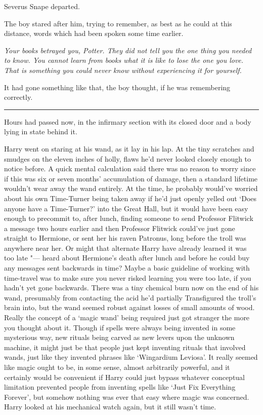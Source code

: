 Severus Snape departed.

The boy stared after him, trying to remember, as best as he could at
this distance, words which had been spoken some time earlier.

\emph{Your books betrayed you, Potter. They did not tell you the one
thing you needed to know. You cannot learn from books what it is like to
lose the one you love. That is something you could never know without
experiencing it for yourself.}

It had gone something like that, the boy thought, if he was remembering
correctly.

\begin{center}\rule{3in}{0.4pt}\end{center}

Hours had passed now, in the infirmary section with its closed door and
a body lying in state behind it.

Harry went on staring at his wand, as it lay in his lap. At the tiny
scratches and smudges on the eleven inches of holly, flaws he'd never
looked closely enough to notice before. A quick mental calculation said
there was no reason to worry since if this was six or seven months'
accumulation of damage, then a standard lifetime wouldn't wear away the
wand entirely. At the time, he probably would've worried about his own
Time-Turner being taken away if he'd just openly yelled out `Does anyone
have a Time-Turner?' into the Great Hall, but it would have been easy
enough to precommit to, after lunch, finding someone to send Professor
Flitwick a message two hours earlier and then Professor Flitwick
could've just gone straight to Hermione, or sent her his raven Patronus,
long before the troll was anywhere near her. Or might that alternate
Harry have already learned it was too late "--- heard about Hermione's
death after lunch and before he could buy any messages sent backwards in
time? Maybe a basic guideline of working with time-travel was to make
sure you never risked learning you were too late, if you hadn't yet gone
backwards. There was a tiny chemical burn now on the end of his wand,
presumably from contacting the acid he'd partially Transfigured the
troll's brain into, but the wand seemed robust against losses of small
amounts of wood. Really the concept of a `magic wand' being required
just got stranger the more you thought about it. Though if spells were
always being invented in some mysterious way, new rituals being carved
as new levers upon the unknown machine, it might just be that people
just kept inventing rituals that involved wands, just like they invented
phrases like `Wingardium Leviosa'. It really seemed like magic ought to
be, in some sense, almost arbitrarily powerful, and it certainly would
be convenient if Harry could just bypass whatever conceptual limitation
prevented people from inventing spells like `Just Fix Everything
Forever', but somehow nothing was ever that easy where magic was
concerned. Harry looked at his mechanical watch again, but it still
wasn't time.

